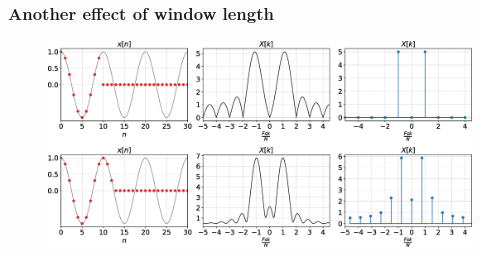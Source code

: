 \documentclass[aspectratio=169]{beamer}
\let\olditem\item
\renewcommand{\item}{\setlength{\itemsep}{\fill}\olditem}
\def\lp{\ensuremath\left(}
\def\rp{\ensuremath\right)}
\begin{document}
\begin{frame}[t]
  \frametitle{Another effect of window length}
  \begin{figure}
  \centering
  \includegraphics[width=1\textwidth]{img/dft-windoweffect.eps}
  \end{figure}
\end{frame}











\end{document}
